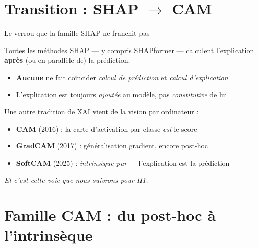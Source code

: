 \documentclass[10pt]{beamer}
\begin{document}
\section{Transition : SHAP $\to$ CAM}

\begin{frame}{Le verrou que la famille SHAP ne franchit pas}
  \begin{tcolorbox}[colback=red!3, colframe=red!60!black, arc=3mm,
                    fonttitle=\bfseries, title=Le constat après le panorama SHAP]
    Toutes les méthodes SHAP — y compris SHAPformer — calculent l'explication
    \textbf{après} (ou en parallèle de) la prédiction.
    \begin{itemize}
      \item \textbf{Aucune} ne fait coïncider \emph{calcul de prédiction} et \emph{calcul d'explication}
      \item L'explication est toujours \emph{ajoutée} au modèle, pas \emph{constitutive} de lui
    \end{itemize}
  \end{tcolorbox}

  \vspace{4pt}

  \begin{tcolorbox}[colback=newcontrib!5, colframe=newcontrib!70!black, arc=3mm,
                    fonttitle=\bfseries, title=La rupture : famille CAM]
    Une autre tradition de XAI vient de la vision par ordinateur :
    \begin{itemize}
      \item \textbf{CAM} (2016) : la carte d'activation par classe \emph{est} le score
      \item \textbf{GradCAM} (2017) : généralisation gradient, encore post-hoc
      \item \textbf{SoftCAM} (2025) : \emph{intrinsèque pur} — l'explication est la prédiction
    \end{itemize}
    \centering
    \emph{Et c'est cette voie que nous suivrons pour H1.}
  \end{tcolorbox}
\end{frame}

\section{Famille CAM : du post-hoc à l'intrinsèque}
\end{document}
